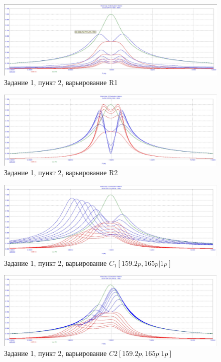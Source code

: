 \documentclass[a4paper, 14pt]{extarticle}%
\begin{document}
\begin{figure}[h!]
	\centering
			\includegraphics[width=1.1\linewidth]{1.2_varR1.jpg}
            \caption{Задание 1, пункт 2, варьирование R1}
	\label{A}
\end{figure}

\begin{figure}[h!]
	\centering
			\includegraphics[width=1.1\linewidth]{1.2_varR2.jpg}
            \caption{Задание 1, пункт 2, варьирование R2}
	\label{A}
\end{figure}


\begin{figure}[h!]
	\centering
			\includegraphics[width=1.1\linewidth]{1.2_varC1.jpg}
            \caption{Задание 1, пункт 2, варьирование $C_1 [159.2p, 165p|1p]$}
	\label{A}
\end{figure}


\begin{figure}[h!]
	\centering
			\includegraphics[width=1.1\linewidth]{1.2_varC2.jpg}
            \caption{Задание 1, пункт 2, варьирование $C2 [159.2p, 165p|1p]$}
	\label{A}
\end{figure}
\end{document}
